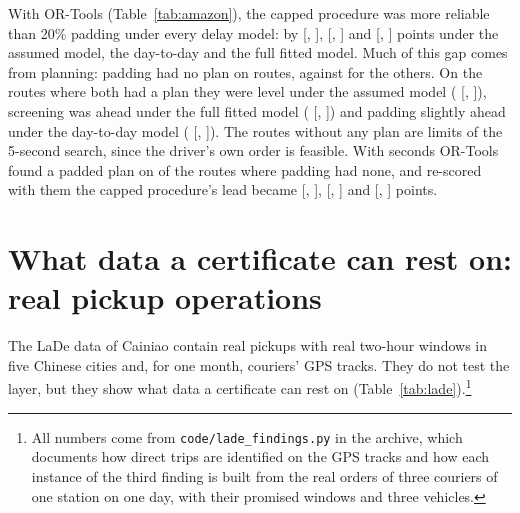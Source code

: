 \documentclass[11pt,a4paper]{article}
\theoremstyle{remark}
\begin{document}
With OR-Tools (Table~\ref{tab:amazon}), the capped procedure was more reliable than
20\% padding under every delay model: by \AmzCapDiff{} [\AmzCapDiffLo, \AmzCapDiffHi],
\AmzDCapDiff{} [\AmzDCapDiffLo, \AmzDCapDiffHi] and \AmzTCapDiff{} [\AmzTCapDiffLo,
\AmzTCapDiffHi] points under the assumed model, the day-to-day and the full fitted
model. Much of this gap comes from planning: padding had no plan on \AmzConsNoPlan{}
routes, against \AmzNoPlan{} for the others. On the \AmzBoth{} routes where both had a
plan they were level under the assumed model (\AmzBothDiff{} [\AmzBothDiffLo,
\AmzBothDiffHi]), screening was ahead under the full fitted model (\AmzTBothDiff{}
[\AmzTBothDiffLo, \AmzTBothDiffHi]) and padding slightly ahead under the day-to-day
model (\AmzDBothDiff{} [\AmzDBothDiffLo, \AmzDBothDiffHi]). The \AmzNoPlan{} routes
without any plan are limits of the 5-second search, since the driver's own order is
feasible. With \SrchSeconds{} seconds OR-Tools found a padded plan on \SrchConsFound{} of
the \SrchConsMissing{} routes where padding had none, and re-scored with them the
capped procedure's lead became \SrchDiff{} [\SrchDiffLo, \SrchDiffHi], \SrchDDiff{}
[\SrchDDiffLo, \SrchDDiffHi] and \SrchTDiff{} [\SrchTDiffLo, \SrchTDiffHi] points.



\section{What data a certificate can rest on: real pickup operations}\label{sec:real-ops}
\setcounter{table}{0}

The LaDe data of Cainiao \citep{wu2023lade} contain real pickups with real two-hour
windows in five Chinese cities and, for one month, couriers' GPS tracks. They do not test
the layer, but they show what data a certificate can rest on
(Table~\ref{tab:lade}).\footnote{All numbers come from \texttt{code/lade\_findings.py} in the
archive, which documents how direct trips are identified on the GPS tracks and how each
instance of the third finding is built from the real orders of three couriers of one
station on one day, with their promised windows and three vehicles.}
\end{document}
